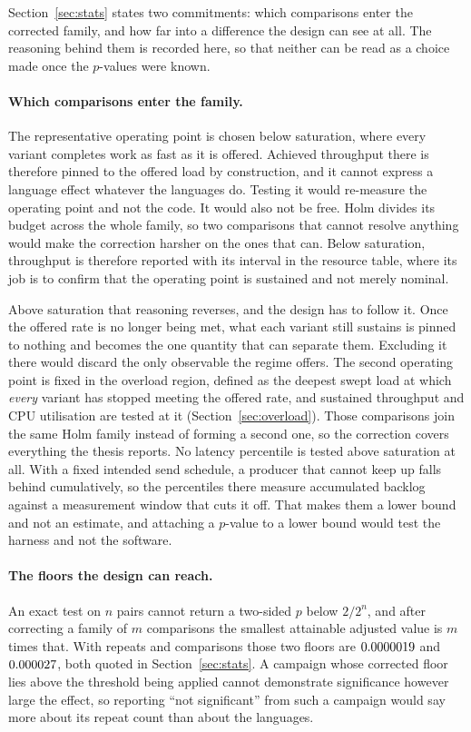\documentclass[english,oneside,a4paper,censored,csm,software-track-2020]{HYthesisML}
\begin{document}
\begin{appendices}
Section~\ref{sec:stats} states two commitments: which comparisons enter the corrected family, and
how far into a difference the design can see at all. The reasoning behind them is recorded here,
so that neither can be read as a choice made once the $p$-values were known.

\paragraph{Which comparisons enter the family.}
The representative operating point is chosen below saturation, where every variant completes work
as fast as it is offered. Achieved throughput there is therefore pinned to the offered load by
construction, and it cannot express a language effect whatever the languages do. Testing it would
re-measure the operating point and not the code. It would also not be free. Holm divides its
budget across the whole family, so two comparisons that cannot resolve anything would make the
correction harsher on the ones that can. Below saturation, throughput is therefore reported with
its interval in the resource table, where its job is to confirm that the operating point is
sustained and not merely nominal.

Above saturation that reasoning reverses, and the design has to follow it. Once the offered rate is
no longer being met, what each variant still sustains is pinned to nothing and becomes the one
quantity that can separate them. Excluding it there would discard the only observable the
regime offers. The second operating point is fixed in the overload region, defined as the deepest
swept load at which \emph{every} variant has stopped meeting the offered rate, and sustained
throughput and CPU utilisation are tested at it (Section~\ref{sec:overload}). Those comparisons
join the same Holm family instead of forming a second one, so the correction covers everything
the thesis reports. No latency percentile is tested above saturation at all. With a fixed intended
send schedule, a producer that cannot keep up falls behind cumulatively, so the percentiles there
measure accumulated backlog against a measurement window that cuts it off. That makes them a
lower bound and not an estimate, and attaching a $p$-value to a lower bound would test the harness
and not the software.

\paragraph{The floors the design can reach.}
An exact test on $n$ pairs cannot return a two-sided $p$ below $2/2^{n}$, and after correcting a
family of $m$ comparisons the smallest attainable adjusted value is $m$ times that. With
\NRepeats{} repeats and \NTests{} comparisons those two floors are $0.0000019$ and
$0.000027$, both quoted in Section~\ref{sec:stats}. A campaign whose corrected floor lies
above the threshold being applied cannot demonstrate significance however large the effect, so
reporting ``not significant'' from such a campaign would say more about its repeat count than
about the languages.


\end{appendices}
\end{document}

